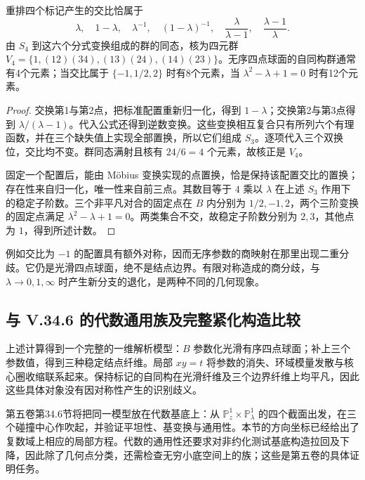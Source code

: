 \begin{proposition}
	\label{g4:prop:0605:permutations}
	重排四个标记产生的交比恰属于
	\[
		\lambda,\quad 1-\lambda,\quad\lambda^{-1},\quad
		(1-\lambda)^{-1},\quad\frac{\lambda}{\lambda-1},\quad
		\frac{\lambda-1}{\lambda}.
	\]
	由 \(S_4\) 到这六个分式变换组成的群的同态，核为四元群
	\(V_4=\{1,(12)(34),(13)(24),(14)(23)\}\)。无序四点球面的自同构群通常有4个元素；当交比属于 \(\{-1,1/2,2\}\) 时有8个元素，当 \(\lambda^2-\lambda+1=0\) 时有12个元素。
\end{proposition}
\begin{proof}
	交换第1与第2点，把标准配置重新归一化，得到 \(1-\lambda\)；交换第2与第3点得到 \(\lambda/(\lambda-1)\)。代入公式还得到逆数变换。这些变换相互复合只有所列六个有理函数，并在三个缺失值上实现全部置换，所以它们组成 \(S_3\)。逐项代入三个双换位，交比均不变。群同态满射且核有 \(24/6=4\) 个元素，故核正是 \(V_4\)。

	固定一个配置后，能由 Möbius 变换实现的点置换，恰是保持该配置交比的置换；存在性来自归一化，唯一性来自前三点。其数目等于 \(4\) 乘以 \(\lambda\) 在上述 \(S_3\) 作用下的稳定子阶数。三个非平凡对合的固定点在 \(B\) 内分别为 \(1/2,-1,2\)，两个三阶变换的固定点满足 \(\lambda^2-\lambda+1=0\)。两类集合不交，故稳定子阶数分别为 \(2,3\)，其他点为 \(1\)，得到所述计数。
\end{proof}

例如交比为 \(-1\) 的配置具有额外对称，因而无序参数的商映射在那里出现二重分歧。它仍是光滑四点球面，绝不是结点边界。有限对称造成的商分歧，与 \(\lambda\to0,1,\infty\) 时产生新分支的退化，是两种不同的几何现象。

\subsection{与 V.34.6 的代数通用族及完整紧化构造比较}
\label{g4:subsec:0605:06}
上述计算得到一个完整的一维解析模型：\(B\) 参数化光滑有序四点球面；补上三个参数值，得到三种稳定结点纤维。局部 \(xy=t\) 将参数的消失、环域模量发散与核心圈收缩联系起来。保持标记的自同构在光滑纤维及三个边界纤维上均平凡，因此这些具体对象没有因对称性产生的识别歧义。

\ProseParagraphBreak

第五卷第34.6节将把同一模型放在代数基底上：从 \(\mathbb P^1_z\times\mathbb P^1_\lambda\) 的四个截面出发，在三个碰撞中心作吹起，并验证平坦性、基变换与通用性。本节的方向坐标已经给出了复数域上相应的局部方程。代数的通用性还要求对非约化测试基底构造拉回及下降，因此除了几何点分类，还需检查无穷小底空间上的族；这些是第五卷的具体证明任务。
